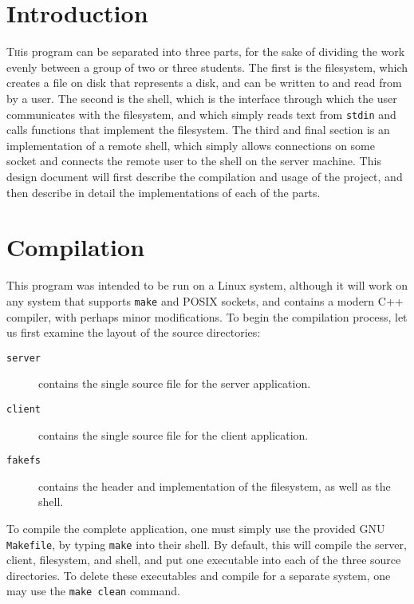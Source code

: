 \documentclass[twoside]{article}
\begin{document}
\begin{multicols}{2} %

\section{Introduction}

\lettrine[nindent=0em,lines=3]{T} his program can be separated into three parts,
for the sake of dividing the work
evenly between a group of two or three students. The first is the filesystem,
which creates a file on disk that represents a disk, and can be written to and
read from by a user.  The second is the shell, which is the interface through
which the user communicates with the filesystem, and which simply reads text
from \texttt{stdin} and calls functions that implement the filesystem.  The third and
final section is an implementation of a remote shell, which simply allows
connections on some socket and connects the remote user to the shell on the
server machine.  This design document will first describe the compilation and
usage of the project, and then describe in detail the implementations of each of
the parts.


\section{Compilation}

This program was intended to be run on a Linux system, although it will work on
any system that supports \texttt{make} and POSIX sockets, and contains a modern
C++ compiler, with perhaps minor modifications. To begin the compilation
process, let us first examine the layout of the source directories:

\begin{description}
  \item[\texttt{server}] contains the single source file for the server
    application.
  \item[\texttt{client}] contains the single source file for the client
    application.
  \item[\texttt{fakefs}] contains the header and implementation of the
    filesystem, as well as the shell.
\end{description}

To compile the complete application, one must simply use the provided GNU
\texttt{Makefile}, by typing \texttt{make} into their shell. By default, this will compile the
server, client, filesystem, and shell, and put one executable into each of the
three source directories. To delete these executables and compile for a separate
system, one may use the \texttt{make clean} command.


\end{multicols}
\end{document}
